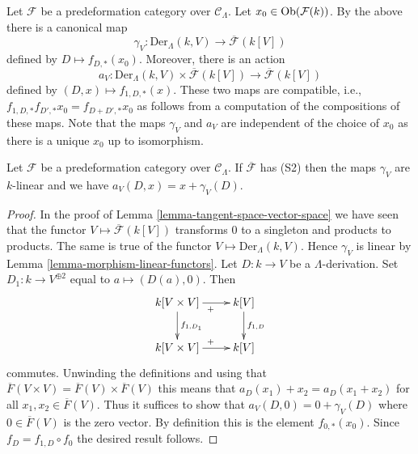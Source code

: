 \medskip\noindent
Let $\mathcal{F}$ be a predeformation category over $\mathcal{C}_\Lambda$.
Let $x_0 \in \mathop{\mathrm{Ob}}\nolimits(\mathcal{F}(k))$. By the above there is a canonical
map
$$
\gamma_V :
\text{Der}_\Lambda(k, V)
\longrightarrow
\overline{\mathcal{F}}(k[V])
$$
defined by $D \mapsto f_{D, *}(x_0)$. Moreover, there is an action
$$
a_V : \text{Der}_\Lambda(k, V) \times \overline{\mathcal{F}}(k[V])
\longrightarrow
\overline{\mathcal{F}}(k[V])
$$
defined by $(D, x) \mapsto f_{1, D, *}(x)$. These two maps are compatible,
i.e., $f_{1, D, *}f_{D', *}x_0 = f_{D + D', *}x_0$ as follows from a
computation of the compositions of these maps. Note that the maps
$\gamma_V$ and $a_V$ are independent of the choice of $x_0$ as there
is a unique $x_0$ up to isomorphism.

\begin{lemma}
\label{lemma-action-linear}
Let $\mathcal{F}$ be a predeformation category over $\mathcal{C}_\Lambda$.
If $\overline{\mathcal{F}}$ has (S2) then the maps $\gamma_V$ are
$k$-linear and we have $a_V(D, x) = x + \gamma_V(D)$.
\end{lemma}

\begin{proof}
In the proof of
Lemma \ref{lemma-tangent-space-vector-space}
we have seen that the functor $V \mapsto \overline{\mathcal{F}}(k[V])$
transforms $0$ to a singleton and products to products. The same is
true of the functor $V \mapsto \text{Der}_\Lambda(k, V)$.
Hence $\gamma_V$ is linear by
Lemma \ref{lemma-morphism-linear-functors}.
Let $D : k \to V$ be a $\Lambda$-derivation.
Set $D_1 : k \to V^{\oplus 2}$ equal to $a \mapsto (D(a), 0)$.
Then
$$
\xymatrix{
k[V \times V] \ar[r]_{+} \ar[d]^{f_{1, D_1}} & k[V] \ar[d]^{f_{1, D}} \\
k[V \times V] \ar[r]^{+} & k[V]
}
$$
commutes. Unwinding the definitions and using that
$\overline{F}(V \times V) = \overline{F}(V) \times \overline{F}(V)$
this means that $a_D(x_1) + x_2 = a_D(x_1 + x_2)$ for all
$x_1, x_2 \in \overline{F}(V)$. Thus it suffices to show that
$a_V(D, 0) = 0 + \gamma_V(D)$ where $0 \in \overline{F}(V)$ is
the zero vector. By definition this is the element $f_{0, *}(x_0)$.
Since $f_D = f_{1, D} \circ f_0$ the desired result follows.
\end{proof}

